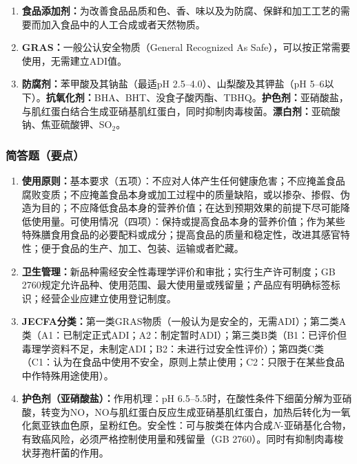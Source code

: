 {\begin{enumerate}[leftmargin=*, itemsep=4pt]
    \item \textbf{食品添加剂：}为改善食品品质和色、香、味以及为防腐、保鲜和加工工艺的需要而加入食品中的人工合成或者天然物质。
    \item \textbf{GRAS：}一般公认安全物质（General Recognized As Safe），可以按正常需要使用，无需建立ADI值。
    \item \textbf{防腐剂：}苯甲酸及其钠盐（最适pH 2.5--4.0）、山梨酸及其钾盐（pH 5--6以下）。\textbf{抗氧化剂：}BHA、BHT、没食子酸丙酯、TBHQ。\textbf{护色剂：}亚硝酸盐，与肌红蛋白结合生成亚硝基肌红蛋白，同时抑制肉毒梭菌。\textbf{漂白剂：}亚硫酸钠、焦亚硫酸钾、SO$_2$。
\end{enumerate}

\subsubsection*{简答题（要点）}

\begin{enumerate}[leftmargin=*, itemsep=6pt]
    \item \textbf{使用原则：}基本要求（五项）：不应对人体产生任何健康危害；不应掩盖食品腐败变质；不应掩盖食品本身或加工过程中的质量缺陷，或以掺杂、掺假、伪造为目的；不应降低食品本身的营养价值；在达到预期效果的前提下尽可能降低使用量。可使用情况（四项）：保持或提高食品本身的营养价值；作为某些特殊膳食用食品的必要配料或成分；提高食品的质量和稳定性，改进其感官特性；便于食品的生产、加工、包装、运输或者贮藏。

    \item \textbf{卫生管理：}新品种需经安全性毒理学评价和审批；实行生产许可制度；GB 2760规定允许品种、使用范围、最大使用量或残留量；产品应有明确标签标识；经营企业应建立使用登记制度。

    \item \textbf{JECFA分类：}第一类GRAS物质（一般认为是安全的，无需ADI）；第二类A类（A1：已制定正式ADI；A2：制定暂时ADI）；第三类B类（B1：已评价但毒理学资料不足，未制定ADI；B2：未进行过安全性评价）；第四类C类（C1：认为在食品中使用不安全，原则上禁止使用；C2：只限于在某些食品中作特殊用途使用）。

    \item \textbf{护色剂（亚硝酸盐）：}作用机理：pH 6.5--5.5时，在酸性条件下细菌分解为亚硝酸，转变为NO，NO与肌红蛋白反应生成亚硝基肌红蛋白，加热后转化为一氧化氮亚铁血色原，呈粉红色。安全性：可与胺类在体内合成$N$-亚硝基化合物，有致癌风险，必须严格控制使用量和残留量（GB 2760）。同时有抑制肉毒梭状芽孢杆菌的作用。


\end{enumerate}}
